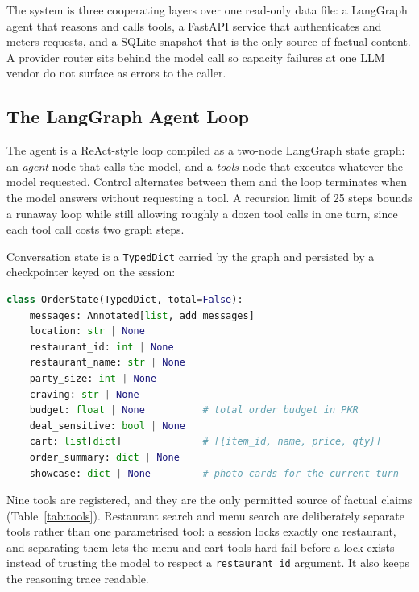 \documentclass[11pt,a4paper]{article}
\newcommand{\code}[1]{\texttt{\small #1}}
\begin{document}
The system is three cooperating layers over one read-only data file: a
LangGraph agent that reasons and calls tools, a FastAPI service that
authenticates and meters requests, and a SQLite snapshot that is the only
source of factual content. A provider router sits behind the model call so
capacity failures at one LLM vendor do not surface as errors to the caller.

\subsection{The LangGraph Agent Loop}

The agent is a ReAct-style loop compiled as a two-node LangGraph state graph:
an \emph{agent} node that calls the model, and a \emph{tools} node that
executes whatever the model requested. Control alternates between them and the
loop terminates when the model answers without requesting a tool. A recursion
limit of 25 steps bounds a runaway loop while still allowing roughly a dozen
tool calls in one turn, since each tool call costs two graph steps.

Conversation state is a \code{TypedDict} carried by the graph and persisted by
a checkpointer keyed on the session:

\begin{lstlisting}[language=Python,caption={Conversation state (agent/state.py, abridged).}]
class OrderState(TypedDict, total=False):
    messages: Annotated[list, add_messages]
    location: str | None
    restaurant_id: int | None
    restaurant_name: str | None
    party_size: int | None
    craving: str | None
    budget: float | None          # total order budget in PKR
    deal_sensitive: bool | None
    cart: list[dict]              # [{item_id, name, price, qty}]
    order_summary: dict | None
    showcase: dict | None         # photo cards for the current turn
\end{lstlisting}

Nine tools are registered, and they are the only permitted source of factual
claims (Table~\ref{tab:tools}). Restaurant search and menu search are
deliberately separate tools rather than one parametrised tool: a session locks
exactly one restaurant, and separating them lets the menu and cart tools
hard-fail before a lock exists instead of trusting the model to respect a
\code{restaurant\_id} argument. It also keeps the reasoning trace readable.
\end{document}
